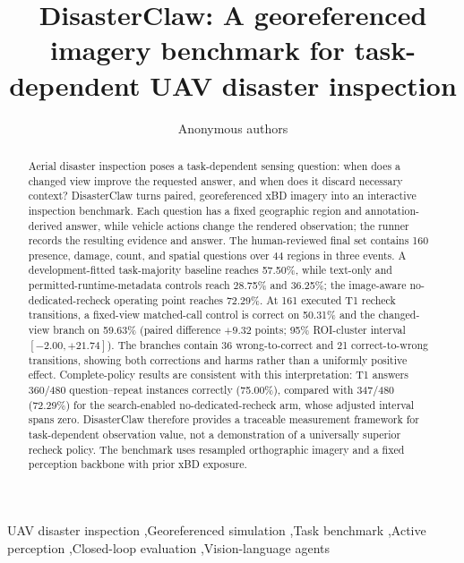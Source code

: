 \documentclass[final,5p,times,twocolumn]{elsarticle}
\makeatletter
\def@path{{../cja_en/}}
\makeatother
\begin{document}
\begin{frontmatter}
\title{DisasterClaw: A georeferenced imagery benchmark for task-dependent UAV disaster inspection}
\author{Anonymous authors}
\begin{abstract}
Aerial disaster inspection poses a task-dependent sensing question: when does a changed view improve the requested answer, and when does it discard necessary context? DisasterClaw turns paired, georeferenced xBD imagery into an interactive inspection benchmark. Each question has a fixed geographic region and annotation-derived answer, while vehicle actions change the rendered observation; the runner records the resulting evidence and answer. The human-reviewed final set contains 160 presence, damage, count, and spatial questions over 44 regions in three events. A development-fitted task-majority baseline reaches 57.50\%, while text-only and permitted-runtime-metadata controls reach 28.75\% and 36.25\%; the image-aware no-dedicated-recheck operating point reaches 72.29\%. At 161 executed T1 recheck transitions, a fixed-view matched-call control is correct on 50.31\% and the changed-view branch on 59.63\% (paired difference $+9.32$ points; 95\% ROI-cluster interval $[-2.00,+21.74]$). The branches contain 36 wrong-to-correct and 21 correct-to-wrong transitions, showing both corrections and harms rather than a uniformly positive effect. Complete-policy results are consistent with this interpretation: T1 answers 360/480 question--repeat instances correctly (75.00\%), compared with 347/480 (72.29\%) for the search-enabled no-dedicated-recheck arm, whose adjusted interval spans zero. DisasterClaw therefore provides a traceable measurement framework for task-dependent observation value, not a demonstration of a universally superior recheck policy. The benchmark uses resampled orthographic imagery and a fixed perception backbone with prior xBD exposure.
\end{abstract}
\begin{keyword}
UAV disaster inspection \sep Georeferenced simulation \sep Task benchmark \sep Active perception \sep Closed-loop evaluation \sep Vision-language agents
\end{keyword}
\end{frontmatter}











\appendix
\setcounter{table}{0}
\renewcommand{\theHtable}{A.\arabic{table}}


\begingroup\small
\makeatletter{}\makeatother


\endgroup
\end{document}
